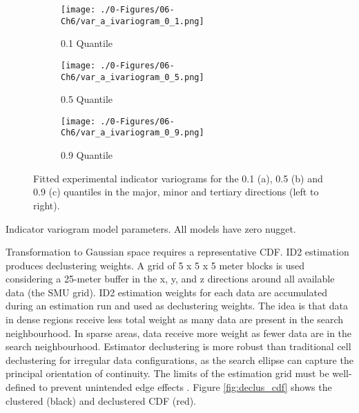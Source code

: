 \begin{figure}
    \begin{subfigure}{1.0\textwidth}
        \centering
        \texttt{[image: ./0-Figures/06-Ch6/var\_a\_ivariogram\_0\_1.png]}
        \caption{0.1 Quantile}
    \end{subfigure}
    \begin{subfigure}{1.0\textwidth}
        \centering
        \texttt{[image: ./0-Figures/06-Ch6/var\_a\_ivariogram\_0\_5.png]}
        \caption{0.5 Quantile}
    \end{subfigure}
    \begin{subfigure}{1.0\textwidth}
        \centering
        \texttt{[image: ./0-Figures/06-Ch6/var\_a\_ivariogram\_0\_9.png]}
        \caption{0.9 Quantile}
    \end{subfigure}
    \caption{Fitted experimental indicator variograms for the 0.1 (a), 0.5 (b) and 0.9 (c) quantiles in the major, minor and tertiary directions (left to right).}
    \label{fig:ind_expvar}
\end{figure}

\begin{table}[!htb]
    \centering
    \caption{Indicator variogram model parameters. All models have zero nugget.}
    \resizebox{0.9\width}{!}{}
    \label{tab:ind_expvar}
\end{table}

Transformation to Gaussian space requires a representative \gls{CDF}.  \Gls{ID2} estimation produces declustering weights. A grid of 5 x 5 x 5 meter blocks is used considering a 25-meter buffer in the x, y, and z directions around all available data (the \gls{SMU} grid). \Gls{ID2} estimation weights for each data are accumulated during an estimation run and used as declustering weights. The idea is that data in dense regions receive less total weight as many data are present in the search neighbourhood. In sparse areas, data receive more weight as fewer data are in the search neighbourhood. Estimator declustering is more robust than traditional cell declustering for irregular data configurations, as the search ellipse can capture the principal orientation of continuity. The limits of the estimation grid must be well-defined to prevent unintended edge effects \citep{Wilde2007}. Figure \ref{fig:declus_cdf} shows the clustered (black) and declustered \gls{CDF} (red).

